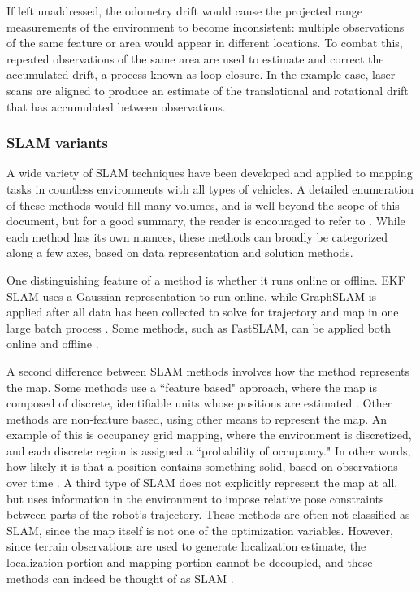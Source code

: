 If left unaddressed, the odometry drift would cause the projected range measurements of the environment to become inconsistent: multiple observations of the same feature or area would appear in different locations. To combat this, repeated observations of the same area are used to estimate and correct the accumulated drift, a process known as loop closure. In the example case, laser scans are aligned to produce an estimate of the translational and rotational drift that has accumulated between observations. 


\subsubsection{SLAM variants}

A wide variety of SLAM techniques have been developed and applied to mapping tasks in countless environments with all types of vehicles. A detailed enumeration of these methods would fill many volumes, and is well beyond the scope of this document, but for a good summary, the reader is encouraged to refer to \cite{SLAMoverview}. While each method has its own nuances, these methods can broadly be categorized along a few axes, based on data representation and solution methods. 

One distinguishing feature of a method is whether it runs online or offline. EKF SLAM uses a Gaussian representation to run online, while GraphSLAM is applied after all data has been collected to solve for trajectory and map in one large batch process \cite{Thrun2005}. Some methods, such as FastSLAM, can be applied both online and offline \cite{Montemerlo2002}.

A second difference between SLAM methods involves how the method represents the map. Some methods use a ``feature based" approach, where the map is composed of discrete, identifiable units whose positions are estimated \cite{Durrant2006}. Other methods are non-feature based, using other means to represent the map. An example of this is occupancy grid mapping, where the environment is discretized, and each discrete region is assigned a ``probability of occupancy." In other words, how likely it is that a position contains something solid, based on observations over time \cite{Fairfield2007}.  A third type of SLAM does not explicitly represent the map at all, but uses information in the environment to impose relative pose constraints between parts of the robot's trajectory. These methods are often not classified as SLAM, since the map itself is not one of the optimization variables. However, since terrain observations are used to generate localization estimate,  the localization portion and mapping portion cannot be decoupled, and these methods can indeed be thought of as SLAM \cite{Caress2008}. 

